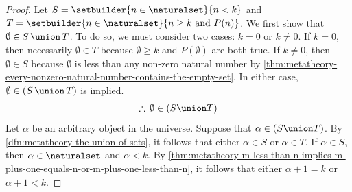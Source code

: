 \begin{proof}
    Let \( S = \setbuilder{n \in \naturalset}{n < k} \) and \( T = \setbuilder{n \in \naturalset}{n \geq k \ \text{and} \ P(n)} \).
    We first show that \( \emptyset \in S \,{\union}\, T \).
    To do so, we must consider two cases: \( k = 0 \) or \( k \neq 0 \).
    If \( k = 0\), then necessarily \( \emptyset \in T \) because \( \emptyset \geq k \) and \( P(\emptyset) \) are both true.
    If \( k \neq 0 \), then \( \emptyset \in S \) because \( \emptyset \) is less than any non-zero natural number by
    \cref{thm:metatheory-every-nonzero-natural-number-contains-the-empty-set}.
    In either case, \( \emptyset \in \mleft( S \,{\union}\, T \mright) \) is implied.
    \begin{equation*}
        \therefore \, \emptyset \in \mleft( S \union T \mright)
    \end{equation*}
    \noindent
    Let \( \alpha \) be an arbitrary object in the universe.
    Suppose that \( \alpha \in \mleft( S \union T \mright) \).
    By \cref{dfn:metatheory-the-union-of-sets}, it follows that either \( \alpha \in S \) or \( \alpha \in T \).
    If \( \alpha \in S \), then \( \alpha \in \naturalset \) and \( \alpha < k \).
    By \cref{thm:metatheory-m-less-than-n-implies-m-plus-one-equals-n-or-m-plus-one-less-than-n}, it follows that
    either \( \alpha + 1 = k \) or \( \alpha + 1 < k \).


\end{proof}
